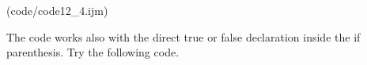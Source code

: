 (code/code12_4.ijm)

The code works also with the direct true or false
declaration inside the if parenthesis. Try the following code.